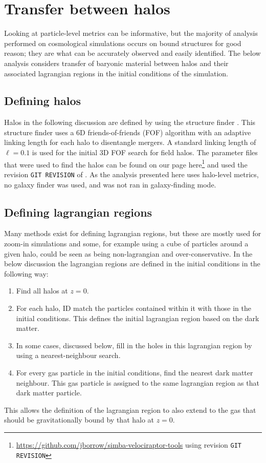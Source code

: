 \section{Transfer between halos}

Looking at particle-level metrics can be informative, but the majority of
analysis performed on cosmological simulations occurs on bound structures for
good reason; they are what can be accurately observed and easily identified.
The below analysis considers transfer of baryonic material between halos and
their associated lagrangian regions in the initial conditions of the
simulation.

\subsection{Defining halos}

Halos in the following discussion are defined by using the \velociraptor{} structure
finder \citep{}. This structure finder uses a 6D friends-of-friends (FOF) algorithm
with an adaptive linking length for each halo to disentangle mergers. A standard
linking length of $\ell = 0.1$ is used for the initial 3D FOF search for field halos.
The parameter files that were used to find the halos can be found on our \github{}
page here\footnote{\url{https://github.com/jborrow/simba-velociraptor-tools} using
revision {\tt GIT REVISION}} and used the revision {\tt GIT REVISION} of
\velociraptor{}. As the analysis presented here uses halo-level metrics, no galaxy
finder was used, and \velociraptor{} was not ran in galaxy-finding mode.

\subsection{Defining lagrangian regions}

Many methods exist for defining lagrangian regions, but these are mostly used for
zoom-in simulations and some, for example using a cube of particles around a given
halo, could be seen as being non-lagrangian and over-conservative. In the below
discussion the lagrangian regions are defined in the initial conditions in the
following way:
\begin{enumerate}
	\item Find all halos at $z=0$.

    \item For each halo, ID match the particles contained within it with those
		  in the initial conditions. This defines the initial lagrangian region
		  based on the dark matter.

	\item In some cases, discussed below, fill in the holes in this lagrangian
	      region by using a nearest-neighbour search.

	\item For every gas particle in the initial conditions, find the nearest dark
	      matter neighbour. This gas particle is assigned to the same lagrangian
	      region as that dark matter particle.
\end{enumerate}
This allows the definition of the lagrangian region to also extend to the gas
that should be gravitationally bound by that halo at $z=0$.


